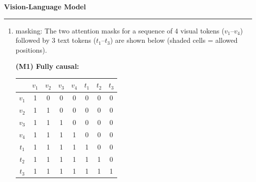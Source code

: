 \documentclass[11pt]{article}
\newenvironment{question}[1]
    {
        \begin{center}
        \textbf{#1} \rmfamily
        \bigskip
        \hrule
    }
    {
        \end{center}
    }
\begin{document}
\begin{question}{Vision-Language Model}
\begin{enumerate}[label=(\alph*)]
    The CLS strategy achieves the highest accuracy (26.2\%) despite providing the least visual information. With only one visual token, the projector needs only to map a single global summary vector into decoder space — a relatively easy one-dimensional problem that 2000 steps is sufficient to solve. The all-patches prefix provides 65 tokens (64 patches $+$ CLS for a $64\!\times\!64$ image with $P\!=\!8$), requiring the projector to learn a useful mapping for 65 spatial positions simultaneously; at 500 steps (cut short by a naming collision with the masking cell), it already reaches 14.8\%, suggesting it would surpass CLS given more training. The interleaved mode persistently fails (1.8\% over 2000 steps): placing 65 visual tokens immediately after BOS violates the frozen decoder's strong prior that BOS is followed by ordinary text, producing chaotic internal representations for the question tokens and preventing coherent generation. These results mirror the \texttt{vit\_pooling} finding — CLS is the weakest representation for spatial tasks in principle, but it offers the simplest optimization target for the projector in a short-training regime, while the patch-based strategies need more steps or decoder adaptation to realise their theoretical advantage.

    \item masking: The two attention masks for a sequence of 4 visual tokens ($v_1$--$v_4$) followed by 3 text tokens ($t_1$--$t_3$) are shown below (shaded cells = allowed positions).

    \textbf{(M1) Fully causal:}

    \begin{center}
    \setlength{\tabcolsep}{4pt}
    \begin{tabular}{c|ccccccc}
     & $v_1$ & $v_2$ & $v_3$ & $v_4$ & $t_1$ & $t_2$ & $t_3$ \\\hline
    $v_1$ & \cellcolor{gray!35}1 & 0 & 0 & 0 & 0 & 0 & 0 \\
    $v_2$ & \cellcolor{gray!35}1 & \cellcolor{gray!35}1 & 0 & 0 & 0 & 0 & 0 \\
    $v_3$ & \cellcolor{gray!35}1 & \cellcolor{gray!35}1 & \cellcolor{gray!35}1 & 0 & 0 & 0 & 0 \\
    $v_4$ & \cellcolor{gray!35}1 & \cellcolor{gray!35}1 & \cellcolor{gray!35}1 & \cellcolor{gray!35}1 & 0 & 0 & 0 \\
    $t_1$ & \cellcolor{gray!35}1 & \cellcolor{gray!35}1 & \cellcolor{gray!35}1 & \cellcolor{gray!35}1 & \cellcolor{gray!35}1 & 0 & 0 \\
    $t_2$ & \cellcolor{gray!35}1 & \cellcolor{gray!35}1 & \cellcolor{gray!35}1 & \cellcolor{gray!35}1 & \cellcolor{gray!35}1 & \cellcolor{gray!35}1 & 0 \\
    $t_3$ & \cellcolor{gray!35}1 & \cellcolor{gray!35}1 & \cellcolor{gray!35}1 & \cellcolor{gray!35}1 & \cellcolor{gray!35}1 & \cellcolor{gray!35}1 & \cellcolor{gray!35}1 \\
    \end{tabular}
    \end{center}


\end{enumerate}
\end{question}
\end{document}
